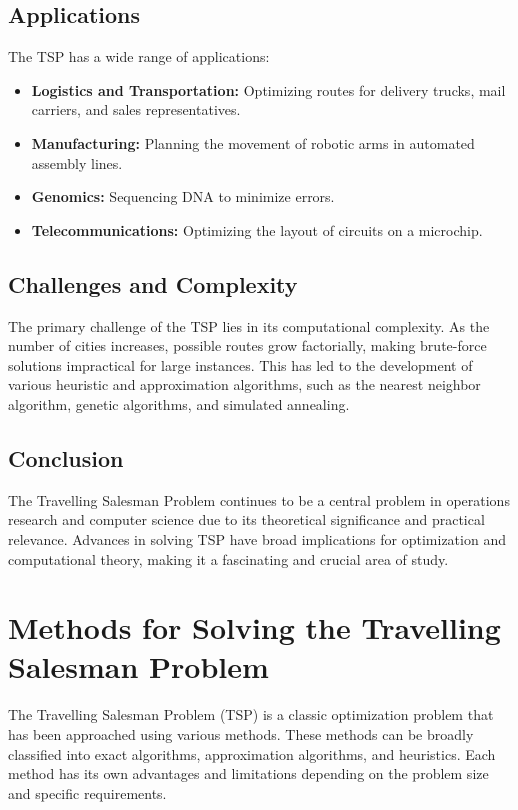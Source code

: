 \documentclass[a4paper]{article}
\begin{document}
\subsection{Applications}
The TSP has a wide range of applications:
\begin{itemize}
    \item \textbf{Logistics and Transportation:} Optimizing routes for delivery trucks, mail carriers, and sales representatives.
    \item \textbf{Manufacturing:} Planning the movement of robotic arms in automated assembly lines.
    \item \textbf{Genomics:} Sequencing DNA to minimize errors.
    \item \textbf{Telecommunications:} Optimizing the layout of circuits on a microchip.
\end{itemize}

\subsection{Challenges and Complexity}
The primary challenge of the TSP lies in its computational complexity. As the number of cities increases, possible routes grow factorially, making brute-force solutions impractical for large instances. This has led to the development of various heuristic and approximation algorithms, such as the nearest neighbor algorithm, genetic algorithms, and simulated annealing.

\subsection{Conclusion}
The Travelling Salesman Problem continues to be a central problem in operations research and computer science due to its theoretical significance and practical relevance. Advances in solving TSP have broad implications for optimization and computational theory, making it a fascinating and crucial area of study.

\section{Methods for Solving the Travelling Salesman Problem}
The Travelling Salesman Problem (TSP) is a classic optimization problem that has been approached using various methods. These methods can be broadly classified into exact algorithms, approximation algorithms, and heuristics. Each method has its own advantages and limitations depending on the problem size and specific requirements.
\end{document}
